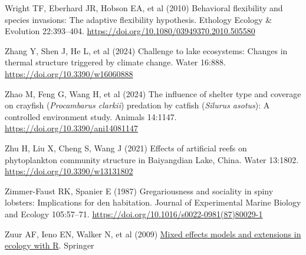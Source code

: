 \documentclass[
  12pt,
  a4paper,
]{scrbook}
\newlength{\cslhangindent}
\newenvironment{CSLReferences}[2] %
 {\begin{list}{}{%
  \setlength{\itemindent}{0pt}
  \setlength{\leftmargin}{0pt}
  \setlength{\parsep}{0pt}
  \ifodd #1
   \setlength{\leftmargin}{\cslhangindent}
   \setlength{\itemindent}{-1\cslhangindent}
  \fi
  \setlength{\itemsep}{#2\baselineskip}}}
 {\end{list}}
\begin{document}
\begin{CSLReferences}{1}{1}
Wright TF, Eberhard JR, Hobson EA, et al (2010) Behavioral flexibility
and species invasions: The adaptive flexibility hypothesis. Ethology
Ecology \& Evolution 22:393--404.
\url{https://doi.org/10.1080/03949370.2010.505580}

Zhang Y, Shen J, He L, et al (2024) Challenge to lake ecosystems:
Changes in thermal structure triggered by climate change. Water 16:888.
\url{https://doi.org/10.3390/w16060888}

Zhao M, Feng G, Wang H, et al (2024) The influence of shelter type and
coverage on crayfish ({\emph{Procambarus clarkii}}) predation by catfish
({\emph{Silurus asotus}}): A controlled environment study. Animals
14:1147. \url{https://doi.org/10.3390/ani14081147}

Zhu H, Liu X, Cheng S, Wang J (2021) Effects of artificial reefs on
phytoplankton community structure in {Baiyangdian Lake, China}. Water
13:1802. \url{https://doi.org/10.3390/w13131802}

Zimmer-Faust RK, Spanier E (1987) Gregariousness and sociality in spiny
lobsters: Implications for den habitation. Journal of Experimental
Marine Biology and Ecology 105:57--71.
\url{https://doi.org/10.1016/s0022-0981(87)80029-1}

Zuur AF, Ieno EN, Walker N, et al (2009)
\href{https://doi.org/10.1007/978-0-387-87458-6}{Mixed effects models
and extensions in ecology with {R}}. Springer

\end{CSLReferences}


\backmatter
\end{document}
